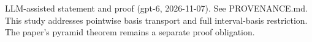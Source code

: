 \documentclass[11pt]{article}
\begin{document}

\bigskip
{\footnotesize LLM-assisted statement and proof (gpt-6, 2026-11-07).
See PROVENANCE.md. This study addresses pointwise basis transport and full interval-basis restriction.
The paper's pyramid theorem remains a separate proof obligation.}
\end{document}
